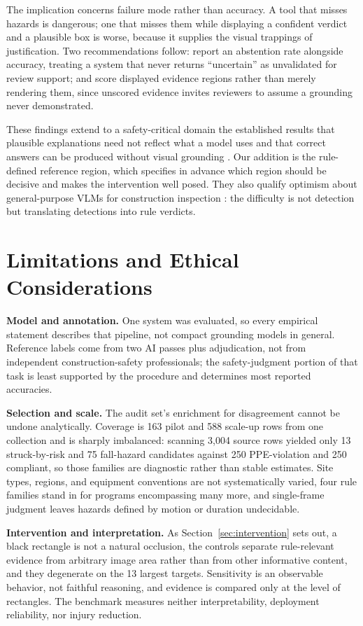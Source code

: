 \documentclass[12pt,letterpaper]{article}
\begin{document}
The implication concerns failure mode rather than accuracy. A tool that misses hazards is dangerous; one that misses them while displaying a confident verdict and a plausible box is worse, because it supplies the visual trappings of justification. Two recommendations follow: report an abstention rate alongside accuracy, treating a system that never returns ``uncertain'' as unvalidated for review support; and score displayed evidence regions rather than merely rendering them, since unscored evidence invites reviewers to assume a grounding never demonstrated.

These findings extend to a safety-critical domain the established results that plausible explanations need not reflect what a model uses \citep{jain2019attention,wu2024faithfulness} and that correct answers can be produced without visual grounding \citep{villa2025merlim}. Our addition is the rule-defined reference region, which specifies in advance which region should be decisive and makes the intervention well posed. They also qualify optimism about general-purpose VLMs for construction inspection \citep{chen2025inspectors}: the difficulty is not detection but translating detections into rule verdicts.

\section{Limitations and Ethical Considerations}

\textbf{Model and annotation.} One system was evaluated, so every empirical statement describes that pipeline, not compact grounding models in general. Reference labels come from two AI passes plus adjudication, not from independent construction-safety professionals; the safety-judgment portion of that task is least supported by the procedure and determines most reported accuracies.

\textbf{Selection and scale.} The audit set's enrichment for disagreement cannot be undone analytically. Coverage is 163 pilot and 588 scale-up rows from one collection and is sharply imbalanced: scanning 3,004 source rows yielded only 13 struck-by-risk and 75 fall-hazard candidates against 250 PPE-violation and 250 compliant, so those families are diagnostic rather than stable estimates. Site types, regions, and equipment conventions are not systematically varied, four rule families stand in for programs encompassing many more, and single-frame judgment leaves hazards defined by motion or duration undecidable.

\textbf{Intervention and interpretation.} As Section~\ref{sec:intervention} sets out, a black rectangle is not a natural occlusion, the controls separate rule-relevant evidence from arbitrary image area rather than from other informative content, and they degenerate on the 13 largest targets. Sensitivity is an observable behavior, not faithful reasoning, and evidence is compared only at the level of rectangles. The benchmark measures neither interpretability, deployment reliability, nor injury reduction.
\end{document}
